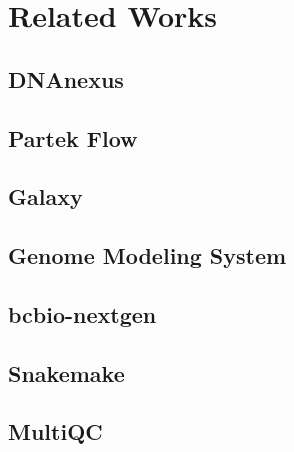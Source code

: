 \chapter{Related Works}
\label{c:related-work}

\section{DNAnexus}

\section{Partek Flow}

\section{Galaxy}

\section{Genome Modeling System}

\section{bcbio-nextgen}

\section{Snakemake}

\section{MultiQC}
